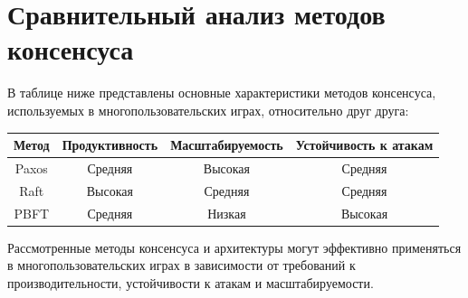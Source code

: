 \chapter{Сравнительный анализ методов консенсуса}

В таблице ниже представлены основные характеристики методов консенсуса, используемых в многопользовательских играх, относительно друг друга:

\begin{center}
	\begin{tabular}{|c|c|c|c|}
		\hline
		Метод & Продуктивность & Масштабируемость & Устойчивость к атакам \\
		\hline
		Paxos & Средняя & Высокая & Средняя \\
		\hline
		Raft & Высокая & Средняя & Средняя \\
		\hline
		PBFT & Средняя & Низкая & Высокая \\
		\hline
	\end{tabular}
\end{center}

Рассмотренные методы консенсуса и архитектуры могут эффективно применяться в многопользовательских играх в зависимости от требований к производительности, устойчивости к атакам и масштабируемости.

